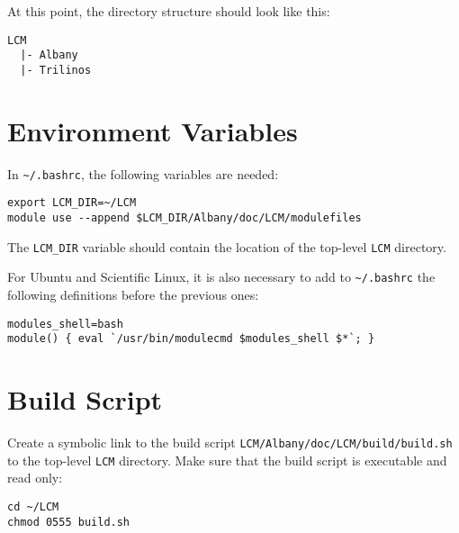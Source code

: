 \documentclass{article}
\begin{document}
At this point, the directory structure should look like this:
\begin{verbatim}
LCM
  |- Albany
  |- Trilinos
\end{verbatim}

\section{Environment Variables}
In \verb+~/.bashrc+, the following variables are needed:
\begin{verbatim}
export LCM_DIR=~/LCM
module use --append $LCM_DIR/Albany/doc/LCM/modulefiles
\end{verbatim}
The \verb+LCM_DIR+ variable should contain the location of the
top-level \verb+LCM+ directory.

For Ubuntu and Scientific Linux, it is also necessary to add to \verb+~/.bashrc+
the following definitions before the previous ones:
\begin{verbatim}
modules_shell=bash
module() { eval `/usr/bin/modulecmd $modules_shell $*`; }
\end{verbatim}

\section{Build Script}
Create a symbolic link to the build script
\verb+LCM/Albany/doc/LCM/build/build.sh+ to the top-level \verb+LCM+
directory. Make sure that the build script is executable and
read only:
\begin{verbatim}
cd ~/LCM
chmod 0555 build.sh
\end{verbatim}
\end{document}
